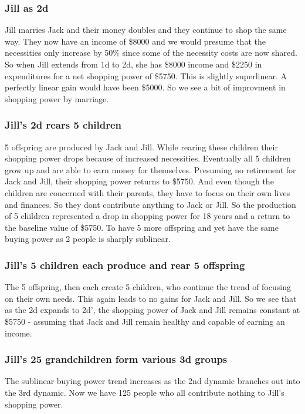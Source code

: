 \documentclass{article}%
\begin{document}
\subsubsection{Jill as 2d}
\label{2dtraditional}
Jill marries Jack and their money doubles and they continue to shop the same way. They now have an income of \$8000 and we would presume that the necessities only increase by 50\% since some of the necessity costs are now shared. So when Jill extends from 1d to 2d, she has \$8000 income and \$2250 in expenditures for a net shopping power of \$5750. This is slightly superlinear. A perfectly linear gain would have been \$5000. So we see a bit of improvment in shopping power by marriage.

\subsubsection{Jill's 2d rears 5 children}
\label{2d'traditional}
    5 offspring are produced by Jack and Jill. While rearing these children their shopping power drops because of increased necessities. Eventually all 5 children grow up and are able to earn money for themselves. Presuming no retirement for Jack and Jill, their shopping power returns to \$5750. And even though the children are concerned with their parents, they have to focus on their own lives and finances. So they dont contribute anything to Jack or Jill. So the production of 5 children represented a drop in shopping power for 18 years and a return to the baseline value of \$5750. To have 5 more offspring and yet have the same buying power as 2 people is sharply sublinear.

\subsubsection{Jill's 5 children each produce and rear 5 offspring}
    The 5 offspring, then each create 5 children, who continue the trend of focusing on their own needs. This again leads to no gains for Jack and Jill. So we see that as the 2d expands to 2d', the shopping power of Jack and Jill remains constant at \$5750 - assuming that Jack and Jill remain healthy and capable of earning an income.

\subsubsection{Jill's 25 grandchildren form various 3d groups}

The sublinear buying power trend increases as the 2nd dynamic branches out into the 3rd dynamic. Now we have 125 people who all contribute nothing to Jill's shopping power.
\end{document}
